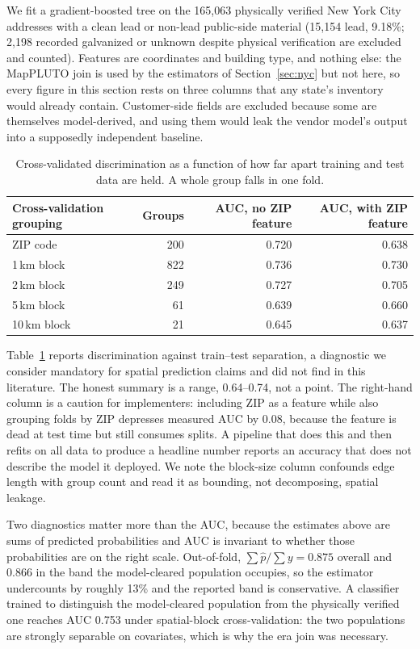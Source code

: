 \documentclass[11pt]{article}
\begin{document}
We fit a gradient-boosted tree on the 165,063 physically verified New York City addresses with
a clean lead or non-lead public-side material (15,154 lead, 9.18\%; 2,198 recorded galvanized
or unknown despite physical verification are excluded and counted). Features are coordinates
and building type, and nothing else: the MapPLUTO join is used by the estimators of
Section~\ref{sec:nyc} but not here, so every figure in this section rests on three columns
that any state's inventory would already contain. Customer-side fields are excluded because
some are themselves model-derived, and using them would leak the vendor model's output into a
supposedly independent baseline.

\begin{table}[t]\centering\small
\caption{Cross-validated discrimination as a function of how far apart training and test data
are held. A whole group falls in one fold.}
\label{tab:cv}
\begin{tabular}{lrrr}
\toprule
Cross-validation grouping & Groups & AUC, no ZIP feature & AUC, with ZIP feature \\
\midrule
ZIP code       & 200 & 0.720 & 0.638 \\
1\,km block    & 822 & 0.736 & 0.730 \\
2\,km block    & 249 & 0.727 & 0.705 \\
5\,km block    &  61 & 0.639 & 0.660 \\
10\,km block   &  21 & 0.645 & 0.637 \\
\bottomrule
\end{tabular}
\end{table}

Table~\ref{tab:cv} reports discrimination against train--test separation, a diagnostic we
consider mandatory for spatial prediction claims and did not find in this literature. The
honest summary is a range, 0.64--0.74, not a point. The right-hand column is a caution for
implementers: including ZIP as a feature while also grouping folds by ZIP depresses measured
AUC by 0.08, because the feature is dead at test time but still consumes splits. A pipeline
that does this and then refits on all data to produce a headline number reports an accuracy
that does not describe the model it deployed. We note the block-size column confounds edge
length with group count and read it as bounding, not decomposing, spatial leakage.

Two diagnostics matter more than the AUC, because the estimates above are sums of predicted
probabilities and AUC is invariant to whether those probabilities are on the right scale.
Out-of-fold, $\sum\hat p/\sum y = 0.875$ overall and 0.866 in the band the model-cleared
population occupies, so the estimator undercounts by roughly 13\% and the reported band is
conservative. A classifier trained to distinguish the model-cleared population from the
physically verified one reaches AUC 0.753 under spatial-block cross-validation: the two
populations are strongly separable on covariates, which is why the era join was necessary.
\end{document}
